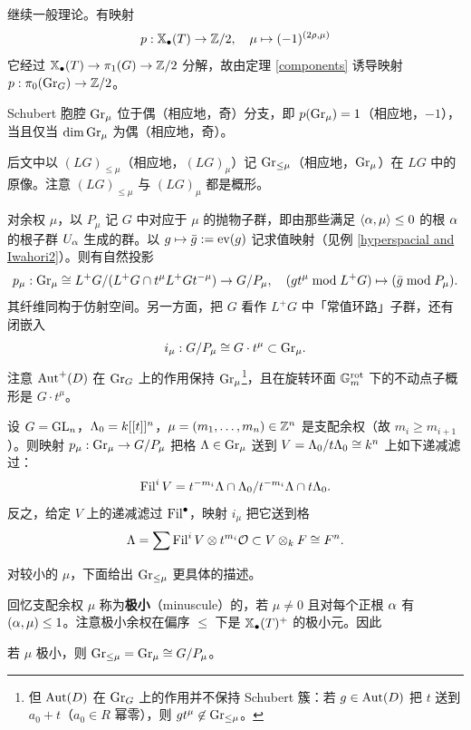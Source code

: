 继续一般理论。有映射
\begin{equation}\label{parity map}
p:\mathbb{X}_\bullet(T)\to {\mathbb Z}/2,\quad \mu\mapsto (-1)^{(2\rho,\mu)}
\end{equation}
它经过 $\mathbb{X}_\bullet(T)\to \pi_1(G)\to {\mathbb Z}/2$ 分解，故由定理 \ref{components} 诱导映射 $p:\pi_0({\operatorname{Gr}}_G)\to {\mathbb Z}/2$。

\begin{cor}\label{parity}
Schubert 胞腔 ${\operatorname{Gr}}_{\mu}$ 位于偶（相应地，奇）分支，即 $p({\operatorname{Gr}}_{\mu})=1$（相应地，$-1$），当且仅当 $\dim {\operatorname{Gr}}_{\mu}$ 为偶（相应地，奇）。
\end{cor}

后文中以 $(LG)_{\leq \mu}$（相应地，$(LG)_\mu$）记 ${\operatorname{Gr}}_{\leq \mu}$（相应地，${\operatorname{Gr}}_\mu$）在 $LG$ 中的原像。注意 $(LG)_{\leq \mu}$ 与 $(LG)_{\mu}$ 都是概形。

对余权 $\mu$，以 $P_\mu$ 记 $G$ 中对应于 $\mu$ 的抛物子群，即由那些满足 $\langle{\alpha},\mu\rangle\leq 0$ 的根 ${\alpha}$ 的根子群 $U_{\alpha}$ 生成的群。以 $g\mapsto \bar{g}:=\operatorname{ev}(g)$ 记求值映射（见例 \ref{hyperspacial and Iwahori2}）。则有自然投影
\[p_\mu: {\operatorname{Gr}}_\mu\cong L^+G/(L^+G\cap t^\mu L^+G t^{-\mu})\to G/P_\mu,\quad (gt^\mu \bmod L^+G)\mapsto (\bar{g}\bmod P_\mu).\]
其纤维同构于仿射空间。另一方面，把 $G$ 看作 $L^+G$ 中「常值环路」子群，还有闭嵌入
\[i_\mu: G/P_\mu\cong G\cdot t^\mu\subset {\operatorname{Gr}}_\mu.\]
注意 ${\operatorname{Aut}}^+(D)$ 在 ${\operatorname{Gr}}_G$ 上的作用保持 ${\operatorname{Gr}}_\mu$\footnote{但 ${\operatorname{Aut}}(D)$ 在 ${\operatorname{Gr}}_G$ 上的作用并不保持 Schubert 簇：若 $g\in {\operatorname{Aut}}(D)$ 把 $t$ 送到 $a_0+t$（$a_0\in R$ 幂零），则 $gt^\mu\not\in {\operatorname{Gr}}_{\leq \mu}$。}，且在旋转环面 ${\mathbb G}_m^{\operatorname{rot}}$ 下的不动点子概形是 $G\cdot t^\mu$。

\begin{ex}
设 $G={\operatorname{GL}}_n$，${\Lambda}_0=k[[t]]^n$，$\mu=(m_1,\ldots,m_n)\in {\mathbb Z}^n$ 是支配余权（故 $m_i\geq m_{i+1}$）。则映射 $p_\mu: {\operatorname{Gr}}_\mu\to G/P_\mu$ 把格 $\Lambda\in {\operatorname{Gr}}_\mu$ 送到 $V={\Lambda}_0/t{\Lambda}_0\cong k^n$ 上如下递减滤过：
\[\operatorname{Fil}^iV=t^{-m_i}{\Lambda}\cap {\Lambda}_0/t^{-m_i}{\Lambda}\cap t{\Lambda}_0.\]
反之，给定 $V$ 上的递减滤过 $\operatorname{Fil}^\bullet$，映射 $i_\mu$ 把它送到格
\[\Lambda = \sum\operatorname{Fil}^iV\otimes  t^{m_i} {\mathcal O}\subset V\otimes_kF\cong F^n.\]
\end{ex}

对较小的 $\mu$，下面给出 ${\operatorname{Gr}}_{\leq \mu}$ 更具体的描述。

回忆支配余权 $\mu$ 称为\textbf{极小}（minuscule）的，若 $\mu\neq 0$ 且对每个正根 ${\alpha}$ 有 $({\alpha},\mu)\leq 1$。注意极小余权在偏序 $\leq$ 下是 $\mathbb{X}_\bullet(T)^+$ 的极小元。因此

\begin{lem}\label{minusch}
若 $\mu$ 极小，则 ${\operatorname{Gr}}_{\leq\mu}={\operatorname{Gr}}_\mu\cong G/P_\mu$。
\end{lem}

